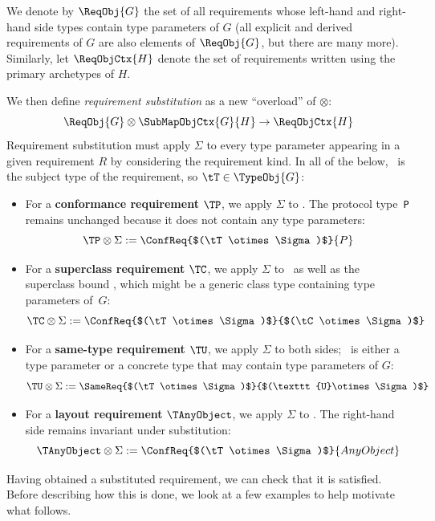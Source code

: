 \documentclass[../generics]{subfiles}
\begin{document}
\begin{definition}
We denote by $\ReqObj{G}$ the set of all requirements whose left-hand and right-hand side types contain type parameters of $G$ (all explicit and derived requirements of $G$ are also elements of $\ReqObj{G}$, but there are many more). Similarly, let $\ReqObjCtx{H}$ denote the set of requirements written using the primary archetypes of $H$.

We then define \emph{requirement substitution} as a new ``overload'' of \index{$\otimes$}$\otimes$:
\[\ReqObj{G}\otimes\SubMapObjCtx{G}{H}\rightarrow\ReqObjCtx{H}\]
Requirement substitution must apply $\Sigma$ to every type parameter appearing in a given requirement $R$ by considering the requirement kind. In all of the below, \tT\ is the subject type of the requirement, so $\tT\in\TypeObj{G}$:
\begin{itemize}
\item For a \textbf{conformance requirement} $\TP$, we apply $\Sigma$ to \tT. The protocol type~\texttt{P} remains unchanged because it does not contain any type parameters:
\[\TP\otimes\Sigma:=\ConfReq{$(\tT\otimes\Sigma)$}{P}\]

\item For a \textbf{superclass requirement} $\TC$, we apply $\Sigma$ to \tT\ as well as the superclass bound \tC, which might be a generic class type containing type parameters of~$G$:
\[\TC\otimes\Sigma:=\ConfReq{$(\tT\otimes\Sigma)$}{$(\tC\otimes\Sigma)$}\]

\item For a \textbf{same-type requirement} $\TU$, we apply $\Sigma$ to both sides; \tU\ is either a type parameter or a concrete type that may contain type parameters of $G$:
\[\TU\otimes\Sigma:=\SameReq{$(\tT\otimes\Sigma)$}{$(\texttt{U}\otimes\Sigma)$}\]

\item For a \textbf{layout requirement} $\TAnyObject$, we apply $\Sigma$ to \tT. The right-hand side remains invariant under substitution:
\[\TAnyObject\otimes\Sigma:=\ConfReq{$(\tT\otimes\Sigma)$}{AnyObject}\]
\end{itemize}
Having obtained a substituted requirement, we can check that it is satisfied. Before describing how this is done, we look at a few examples to help motivate what follows.
\end{definition}
\end{document}
